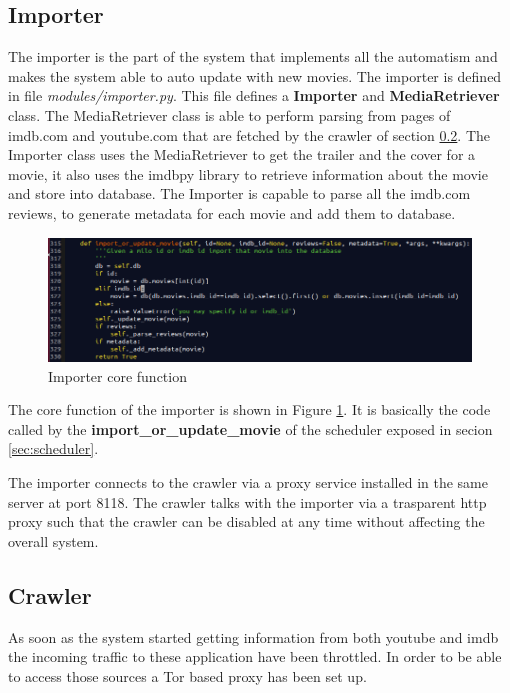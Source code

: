 \subsection{Importer}
\label{sec:importer}

The importer is the part of the system that implements all the automatism and makes the system able to auto update with new movies. The importer is defined in file \textit{modules/importer.py}. This file defines a \textbf{Importer} and \textbf{MediaRetriever} class. The MediaRetriever class is able to perform parsing from pages of imdb.com and youtube.com that are fetched by the crawler of section \ref{sec:crawler}. The Importer class uses the MediaRetriever to get the trailer and the cover for a movie, it also uses the imdbpy \cite{imdbpy} library to retrieve information about the movie and store into database. The Importer is capable to parse all the imdb.com reviews, to generate metadata for each movie and add them to database.

\begin{figure}
  \centering
  \includegraphics[width=\textwidth]{figures/importer_core_function.png}
  \caption{Importer core function}
  \label{fig:importer_core}
\end{figure}

The core function of the importer is shown in Figure \ref{fig:importer_core}. It is basically the code called by the \textbf{import\_or\_update\_movie} of the scheduler exposed in secion \ref{sec:scheduler}.

The importer connects to the crawler via a proxy service installed in the same server at port 8118. The crawler talks with the importer via a trasparent http proxy such that the crawler can be disabled at any time without affecting the overall system.

\subsection{Crawler}
\label{sec:crawler}

As soon as the system started getting information from both youtube and imdb the incoming traffic to these application have been throttled. In order to be able to access those sources a Tor based proxy has been set up.

